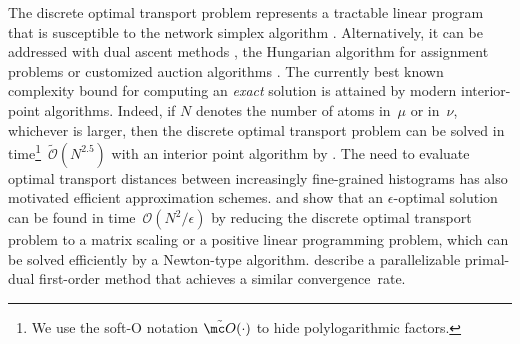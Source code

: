 \documentclass[11pt, a4paper, oneside, reqno]{article}
\begin{document}
	The discrete optimal transport problem represents a tractable linear program that is susceptible to the network simplex algorithm \citep{orlin1997polynomial}. Alternatively, it can be addressed with dual ascent methods \citep{bertsimas1997introduction}, the Hungarian algorithm for assignment problems \citep{kuhn1955hungarian} or customized auction algorithms \citep{bertsekas1981new, bertsekas1992auction}.
	The currently best known complexity bound for computing an {\em exact} solution is attained by modern interior-point algorithms. 
	Indeed, if $N$ denotes the number of atoms in~$\mu$ or in~$\nu$, whichever is larger, then the discrete optimal transport problem can be solved in time\footnote{We use the soft-O notation $\tilde{\mc O}(\cdot)$ to hide polylogarithmic factors.}~$\mathcal{\tilde{O}}(N^{2.5})$ with an interior point algorithm by \citet{lee2014path}. %
	The need to evaluate optimal transport distances between increasingly fine-grained histograms has also motivated efficient approximation schemes. \citet{blanchet2018towards} and \citet{quanrud2018approximating} show that an $\epsilon$-optimal solution can be found in time~$\mathcal{O}(N^2/\epsilon)$ by reducing the discrete optimal transport problem to a matrix scaling or a positive linear programming problem, which can be solved efficiently by a Newton-type algorithm.
    \citet{jambulapati2019direct} describe a parallelizable primal-dual first-order method that achieves a similar convergence~rate.
	
\end{document}
